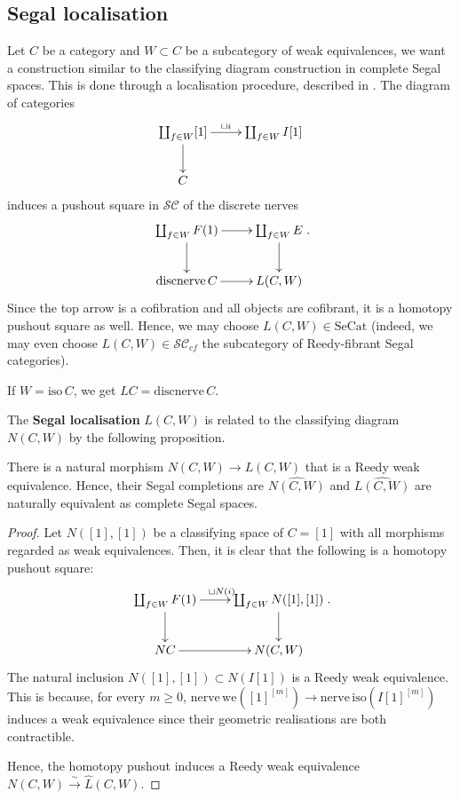 \begin{refsection}
\subsection{Segal localisation}
Let $C$ be a category and $W\subset C$ be a subcategory of weak equivalences, we want a construction similar to the classifying diagram construction in complete Segal spaces. This is done through a localisation procedure, described in \cite{toen-tamsamani-categories-segal-categories-and-applications}. The diagram of categories
\begin{equation} \label{seglocalpushout}
\xymatrix{\coprod_{f\in W}[1]\ar[r]^-{\sqcup i}\ar[d]&\coprod_{f\in W}I[1]\\C}
\end{equation}
induces a pushout square in $\mathcal{SC}$ of the discrete nerves
$$\xymatrix{\coprod_{f\in W}F(1)\ar[r]\ar[d]&\coprod_{f\in W}E\ar[d]\\\mathrm{discnerve}\,C\ar[r]&L(C,W)}.$$
Since the top arrow is a cofibration and all objects are cofibrant, it is a homotopy pushout square as well. Hence, we may choose $L(C,W)\in\mathrm{SeCat}$ (indeed, we may even choose $L(C,W)\in\mathcal{SC}_{cf}$ the subcategory of Reedy-fibrant Segal categories).

If $W=\mathrm{iso}\,C$, we get $LC=\mathrm{discnerve}\,C$.

The \textbf{Segal localisation} $L(C,W)$ is related to the classifying diagram $N(C,W)$ by the following proposition.

\begin{prop}
There is a natural morphism $N(C,W)\to L(C,W)$ that is a Reedy weak equivalence. Hence, their Segal completions are $\widehat{N(C,W)}$ and $\widehat{L(C,W)}$ are naturally equivalent as complete Segal spaces.
\end{prop}
\begin{proof}
Let $N([1],[1])$ be a classifying space of $C=[1]$ with all morphisms regarded as weak equivalences. Then, it is clear that the following is a homotopy pushout square:
$$\xymatrix{\coprod_{f\in W}F(1)\ar[r]^{\sqcup N(i)}\ar[d]&\coprod_{f\in W}N([1],[1])\ar[d]\\NC\ar[r]&N(C,W)}.$$
The natural inclusion $N([1],[1])\subset N(I[1])$ is a Reedy weak equivalence. This is because, for every $m\ge 0$, $\mathrm{nerve}\,\mathrm{we}([1]^{[m]})\to\mathrm{nerve}\,\mathrm{iso}(I[1]^{[m]})$ induces a weak equivalence since their geometric realisations are both contractible.

Hence, the homotopy pushout induces a Reedy weak equivalence $N(C,W)\xrightarrow\sim\hat L(C,W)$.
\end{proof}


\end{refsection}
